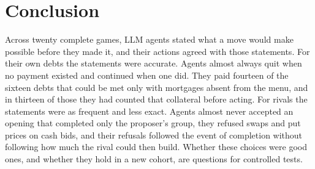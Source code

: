 \section{Conclusion}
\label{sec:conclusion}

Across twenty complete games, LLM agents stated what a move would make possible before they made it, and their actions agreed with those statements. For their own debts the statements were accurate. Agents almost always quit when no payment existed and continued when one did. They paid fourteen of the sixteen debts that could be met only with mortgages absent from the menu, and in thirteen of those they had counted that collateral before acting. For rivals the statements were as frequent and less exact. Agents almost never accepted an opening that completed only the proposer's group, they refused swaps and put prices on cash bids, and their refusals followed the event of completion without following how much the rival could then build. Whether these choices were good ones, and whether they hold in a new cohort, are questions for controlled tests.
